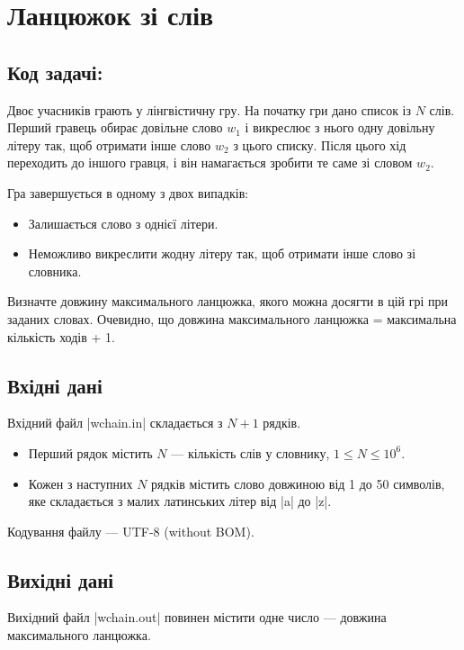 \documentclass[12pt,a4paper]{article}
\begin{document}
\section*{Ланцюжок зі слів \hfill {}}


\subsection*{Код задачі: }

Двоє учасників грають у лінгвістичну гру.
На початку гри дано список із \(N\) слів. Перший гравець обирає довільне слово \(w_1\) і викреслює з нього одну довільну літеру так, щоб отримати інше слово \(w_2\) з цього списку. Після цього хід переходить до іншого гравця, і він намагається зробити те саме зі словом \(w_2\).

Гра завершується в одному з двох випадків:

\begin{itemize}
    \item Залишається слово з однієї літери.
    \item Неможливо викреслити жодну літеру так, щоб отримати інше слово зі словника.
\end{itemize}

Визначте довжину максимального ланцюжка, якого можна досягти в цій грі при заданих словах. Очевидно, що довжина максимального ланцюжка = максимальна кількість ходів + 1.


\subsection*{Вхідні дані}

Вхідний файл |wchain.in| складається з \(N + 1\) рядків.
\begin{itemize}
    \item Перший рядок містить \(N\) --- кількість слів у словнику, \(1 \leq N \leq 10^6\).
    \item Кожен з наступних \(N\) рядків містить слово довжиною від 1 до 50 символів, яке складається з малих латинських літер від |a| до |z|.
\end{itemize}

Кодування файлу --- UTF-8 (without BOM).


\subsection*{Вихідні дані}

Вихідний файл |wchain.out| повинен містити одне число --- довжина максимального ланцюжка.
\end{document}
